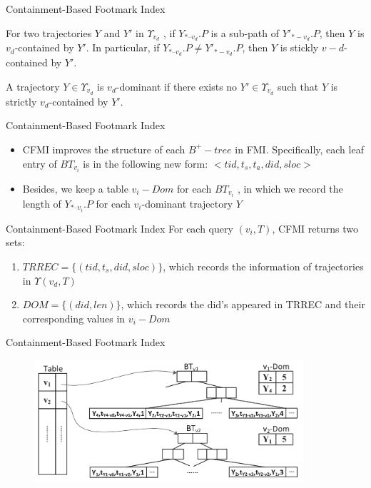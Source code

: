 \documentclass[mathserif]{beamer}
\begin{document}
\begin{frame}{Containment-Based Footmark Index}
\begin{defination}
For two trajectories $Y$ and $Y'$ in $\Upsilon{}_{v_d}$ , if $Y_{*–v_d}.P$ is a sub-path of $Y'_{*-v_d}.P$, then $Y$ is $v_d$-contained by $Y'$. In particular, if $Y_{*–v_d}.P \neq{} Y'_{*-v_d}.P $, then $Y$ is stickly $v-d$-contained by $Y'$.
\end{defination}
\begin{defination}
A trajectory $Y \in{} \Upsilon{}_{v_d}$ is $v_d$-dominant if there exists no $Y' \in{} Υ_{v_d}$ such that $Y$ is strictly $v_d$-contained by $Y'$.
\end{defination}
\end{frame}

\begin{frame}{Containment-Based Footmark Index}
	\begin{itemize}
	\item CFMI improves the structure of each $B^+-tree$ in FMI. Specifically, each leaf entry of $BT_{v_i}$ is in the following new form: $<tid,t_s,t_a,did,sloc>$
	\item Besides, we keep a table $v_i-Dom$ for each $BT_{v_i}$ , in which we record the length of $Y_{*–v_i}.P$ for each $v_i$-dominant trajectory $Y$
	\end{itemize}
\end{frame}

\begin{frame}{Containment-Based Footmark Index}
	For each query $(v_i, T)$, CFMI returns two sets:
		\begin{enumerate}
		\item $TRREC =\{(tid, t_s , did, sloc)\}$, which records the information of trajectories in $\Upsilon{}(v_d ,T )$
		\item $DOM = \{(did, len)\}$, which records the did’s appeared in TRREC and their corresponding values in $v_i - Dom$ 
		\end{enumerate}
\end{frame}

\begin{frame}{Containment-Based Footmark Index}
\begin{figure}
\includegraphics[width = 10cm]{CFMI.png}
\end{figure}
\end{frame}
\end{document}
